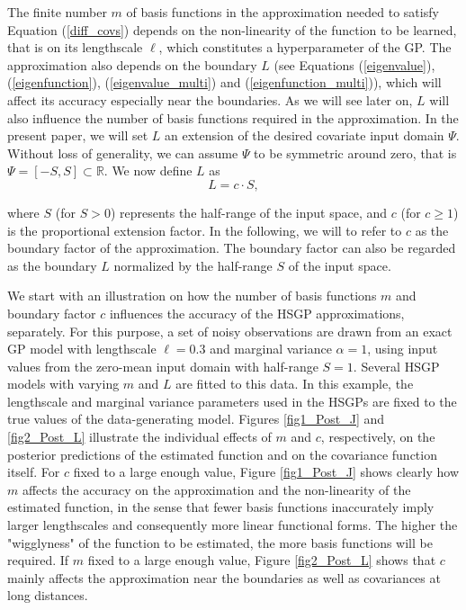 \documentclass[]{interact}
\theoremstyle{plain}%
\theoremstyle{definition}
\theoremstyle{remark}
\begin{document}
The finite number $m$ of basis functions in the approximation needed to satisfy Equation (\ref{diff_covs}) depends on the non-linearity of the function to be learned, that is on its lengthscale $\ell$, which constitutes a hyperparameter of the GP. The approximation also depends on the boundary $L$ (see Equations (\ref{eigenvalue}), (\ref{eigenfunction}), (\ref{eigenvalue_multi}) and (\ref{eigenfunction_multi})), which will affect its accuracy especially near the boundaries. As we will see later on, $L$ will also influence the number of basis functions required in the approximation. In the present paper, we will set $L$ an extension of the desired covariate input domain $\Psi$. Without loss of generality, we can assume $\Psi$ to be symmetric around zero, that is $\Psi=[-S,S] \subset \mathbb{R}$. We now define $L$ as
%
\begin{equation}\label{eq:boundary}
L=c \cdot S,
\end{equation} 

\noindent where $S$ (for $S > 0$) represents the half-range of the input space, and $c$ (for $c \geq 1$) is the proportional extension factor. In the following, we will to refer to $c$ as the boundary factor of the approximation. The boundary factor can also be regarded as the boundary $L$ normalized by the half-range $S$ of the input space.

We start with an illustration on how the number of basis functions $m$ and boundary factor $c$ influences the accuracy of the HSGP approximations, separately. For this purpose, a set of noisy observations are drawn from an exact GP model with lengthscale $\ell=0.3$ and marginal variance $\alpha=1$, using input values from the zero-mean input domain with half-range $S=1$. Several HSGP models with varying $m$ and $L$ are fitted to this data. In this example, the lengthscale and marginal variance parameters used in the HSGPs are fixed to the true values of the data-generating model. 
Figures \ref{fig1_Post_J} and \ref{fig2_Post_L} illustrate the individual effects of $m$ and $c$, respectively, on the posterior predictions of the estimated function and on the covariance function itself. For $c$ fixed to a large enough value, Figure \ref{fig1_Post_J} shows clearly how $m$ affects the accuracy on the approximation and the non-linearity of the estimated function, in the sense that fewer basis functions inaccurately imply larger lengthscales and consequently more linear functional forms.
The higher the "wigglyness" of the function to be estimated, the more basis functions will be required. If $m$ fixed to a large enough value, Figure \ref{fig2_Post_L} shows that $c$ mainly affects the approximation near the boundaries as well as covariances at long distances.
\end{document}
